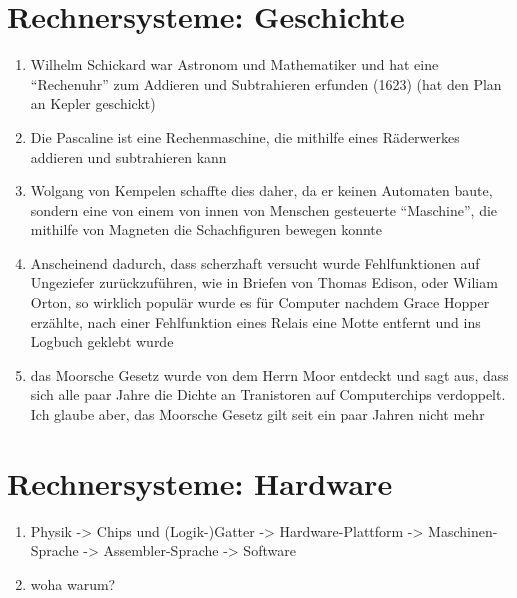\documentclass{gadsescript}
\begin{document}
\maketitle

\section{Rechnersysteme: Geschichte}
\begin{enumerate}[label=\alph*)]
	\item Wilhelm Schickard war Astronom und Mathematiker und hat eine ``Rechenuhr'' zum Addieren und Subtrahieren erfunden (1623) (hat den Plan an Kepler geschickt)
	\item Die Pascaline ist eine Rechenmaschine, die mithilfe eines Räderwerkes addieren und subtrahieren kann
	\item Wolgang von Kempelen schaffte dies daher, da er keinen Automaten baute, sondern eine von einem von innen von Menschen gesteuerte ``Maschine'', die mithilfe von Magneten die Schachfiguren bewegen konnte
	\item Anscheinend dadurch, dass scherzhaft versucht wurde Fehlfunktionen auf Ungeziefer zurückzuführen, wie in Briefen von Thomas Edison, oder Wiliam Orton, so wirklich populär wurde es für Computer nachdem Grace Hopper erzählte, nach einer Fehlfunktion eines Relais eine Motte entfernt und ins Logbuch geklebt wurde
	\item das Moorsche Gesetz wurde von dem Herrn Moor entdeckt und sagt aus, dass sich alle paar Jahre die Dichte an Tranistoren auf Computerchips verdoppelt. Ich glaube aber, das Moorsche Gesetz gilt seit ein paar Jahren nicht mehr
\end{enumerate}

\section{Rechnersysteme: Hardware}
\begin{enumerate}[label=\alph*)]
	\item Physik -> Chips und (Logik-)Gatter -> Hardware-Plattform -> Maschinen-Sprache -> Assembler-Sprache -> Software 
	\item woha warum?
\end{enumerate}
\end{document}
